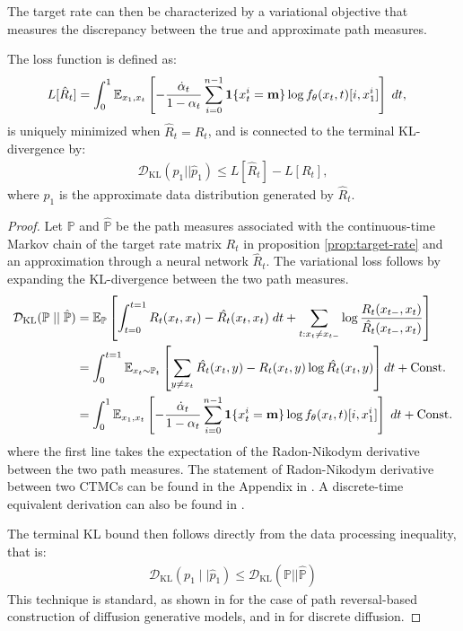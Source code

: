 The target rate can then be characterized by a variational objective that measures the discrepancy between the true and approximate path measures.
\begin{proposition}
The loss function is defined as:
\begin{align}
L[\hat{R}_t]  &= \int_0^1\mathbb{E}_{x_1, x_t} \left[
-\frac{\dot{\alpha}_t}{1 - \alpha_t} \sum_{i=0}^{n-1} \mathbf{1}\{x_t^i = \mathbf{m}\} \log f_\theta(x_t, t)[i, x_1^i]
\right] \; dt,
\end{align}
is uniquely minimized when \(\hat{R}_t = R_t\), and is connected to the terminal KL-divergence by:
\begin{align}
\mathcal{D}_\text{KL}(p_1 || \hat{p}_1) \leq L[\hat{R}_t] - L[R_t],
\end{align}
where $\hat{p}_1$ is the approximate data distribution generated by $\hat{R}_t$.
\end{proposition}
\begin{proof}
Let $\mathbb P$ and $\mathbb{\hat{P}}$ be the path measures associated with the continuous-time Markov chain of the target rate matrix $R_t$ in proposition \ref{prop:target-rate} and an approximation through a neural network $\hat R_t$. The variational loss follows by expanding the KL-divergence between the two path measures.
\begin{align*}
    \mathcal{D}_\text{KL}(\mathbb P \mid\mid \mathbb{\hat{P}})  &= \mathbb{E}_{\mathbb{P}} \left[\int_{t=0}^{t=1} R_t(x_t, x_t) - \hat{R_t}(x_t, x_t) \; dt +  \sum_{t : x_t \neq x_{t-}} \log \frac{R_t(x_{t-}, x_t)}{\hat{R_t}(x_{t-}, x_t)}\right] \\ 
&= \int_0^{t=1} \mathbb{E}_{x_t \sim \mathbb{P}_t} \left[\sum_{y \neq x_t}\hat{R_t}(x_t, y) - R_t(x_t, y) \log \hat{R_t}(x_t, y)\right] dt+ \text{Const.} \\ 
&= \int_0^1\mathbb{E}_{x_1, x_t} \left[
-\frac{\dot{\alpha}_t}{1 - \alpha_t} \sum_{i=0}^{n-1} \mathbf{1}\{x_t^i = \mathbf{m}\} \log f_\theta(x_t, t)[i, x_1^i]
\right] \; dt + \text{Const.}
\end{align*}
where the first line takes the expectation of the Radon-Nikodym derivative between the two path measures. The statement of Radon-Nikodym derivative between two CTMCs can be found in the Appendix in \cite{campbell2024generative}. A discrete-time equivalent derivation can also be found in \cite{shaul2025flow}.

The terminal KL bound then follows directly from the data processing inequality, that is:
\begin{align*}
    \mathcal{D}_\text{KL}(p_1 \mid\mid \hat{p}_1) \leq \mathcal{D}_\text{KL}(\mathbb{P} || \hat{\mathbb{P}})
\end{align*}
This technique is standard, as shown in \cite{vargas2025transportmeetsvariationalinference} for the case of path reversal-based construction of diffusion generative models, and in \cite{holderrieth2025leaps} for discrete diffusion.
\end{proof}

